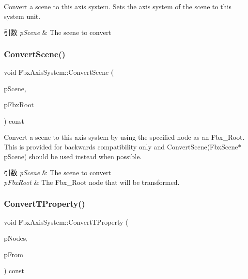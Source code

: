 Convert a scene to this axis system. Sets the axis system of the scene to this system unit. 
\begin{DoxyParams}{引数}
{\em p\+Scene} & The scene to convert \\
\hline
\end{DoxyParams}
\mbox{\label{class_fbx_axis_system_a25f6f6ddb481f280bfecca5d39d14d4c}} 
\subsubsection{\texorpdfstring{Convert\+Scene()}{ConvertScene()}\hspace{0.1cm}{\footnotesize\ttfamily [2/2]}}
{\footnotesize\ttfamily void Fbx\+Axis\+System\+::\+Convert\+Scene (\begin{DoxyParamCaption}\item[{\hyperlink{class_fbx_scene}{Fbx\+Scene} $\ast$}]{p\+Scene,  }\item[{\hyperlink{class_fbx_node}{Fbx\+Node} $\ast$}]{p\+Fbx\+Root }\end{DoxyParamCaption}) const}

Convert a scene to this axis system by using the specified node as an Fbx\+\_\+\+Root. This is provided for backwards compatibility only and Convert\+Scene(\+Fbx\+Scene$\ast$ p\+Scene) should be used instead when possible. 
\begin{DoxyParams}{引数}
{\em p\+Scene} & The scene to convert \\
\hline
{\em p\+Fbx\+Root} & The Fbx\+\_\+\+Root node that will be transformed. \\
\hline
\end{DoxyParams}
\mbox{\label{class_fbx_axis_system_a41956e32f21b9709f40efef34a6d6121}} 
\subsubsection{\texorpdfstring{Convert\+T\+Property()}{ConvertTProperty()}}
{\footnotesize\ttfamily void Fbx\+Axis\+System\+::\+Convert\+T\+Property (\begin{DoxyParamCaption}\item[{\hyperlink{class_fbx_array}{Fbx\+Array}$<$ \hyperlink{class_fbx_node}{Fbx\+Node} $\ast$$>$ \&}]{p\+Nodes,  }\item[{const \hyperlink{class_fbx_axis_system}{Fbx\+Axis\+System} \&}]{p\+From }\end{DoxyParamCaption}) const\hspace{0.3cm}{\ttfamily [protected]}}

